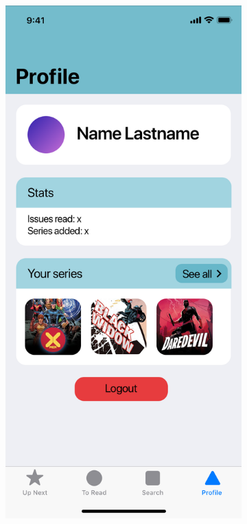 \clearpage

\begin{figure}[p]
  \begin{subfigure}[b]{0.4\textwidth}
    \includegraphics[width=\textwidth]{img/mockups/profile}

\end{subfigure}
\end{figure}
